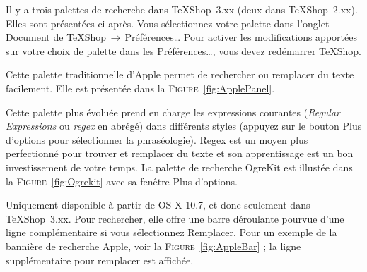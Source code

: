 \documentclass[11pt,french]{article}
\newcommand{\TS}{\textsf{\TeX Shop}}
\newcommand{\acr}[1]{\textsf{#1}}
\newcommand{\cmd}[1]{\textsf{#1}}
\newcommand{\mnu}[1]{\textsf{#1}}
\newcommand{\To}{\,\(\to\)\,}
\begin{document}
Il y a trois palettes de recherche dans \TS\ 3.xx (deux dans \TS\ 2.xx). Elles sont présentées ci-après. Vous sélectionnez votre palette dans l'onglet \mnu{Document} de \mnu{TeXShop}\To\mnu{Préférences…} Pour activer les modifications apportées sur votre choix de palette dans les \mnu{Préférences…}, vous devez redémarrer \TS.
\begin{description}[leftmargin=\parindent]
\item[Palette de recherche Apple]
Cette palette traditionnelle d'Apple permet de rechercher ou remplacer du texte facilement. Elle est présentée dans la \textsc{Figure}~\vref{fig:ApplePanel}. 
\item[Palette de recherche OgreKit]
Cette palette plus évoluée prend en charge les expressions courantes (\emph{Regular Expressions} ou \emph{\acr{regex}} en abrégé) dans différents styles (appuyez sur le bouton \mnu{Plus d'options} pour sélectionner la phraséologie). \acr{Regex} est un moyen plus perfectionné pour trouver et remplacer du texte et son apprentissage est un bon investissement de votre temps. La palette de recherche OgreKit est illustée dans la \textsc{Figure}~\vref{fig:Ogrekit} avec sa fenêtre \cmd{Plus d'options}.
\item[Bannière de recherche Apple]
Uniquement disponible à partir de \cmd{OS X 10.7}, et donc seulement dans \acr{\TS\ 3.xx}. Pour rechercher, elle offre une barre déroulante pourvue d'une ligne complémentaire si vous sélectionnez \mnu{Remplacer}. Pour un exemple de la bannière de recherche Apple, voir la \textsc{Figure}~\vref{fig:AppleBar} ; la ligne supplémentaire pour remplacer est affichée.
\end{description}
\end{document}
